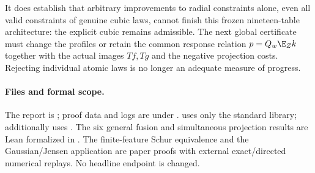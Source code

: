 It does establish that arbitrary improvements to radial constraints alone,
even all valid constraints of genuine cubic laws, cannot finish this frozen
nineteen-table architecture: the explicit cubic remains admissible. The next
global certificate must change the profiles or retain the common response
relation $p=Q_w\E_Zk$ together with the actual images $Tf,Tg$ and the negative
projection costs. Rejecting individual atomic laws is no longer an adequate
measure of progress.

\paragraph{Files and formal scope.}
The report is ; proof
data and logs are under .
 uses only the standard library;
 additionally uses
. The six general fusion and simultaneous projection
results are Lean formalized in .
The finite-feature Schur equivalence and the Gaussian/Jensen application are
paper proofs with external exact/directed numerical replays. No headline
endpoint is changed.
